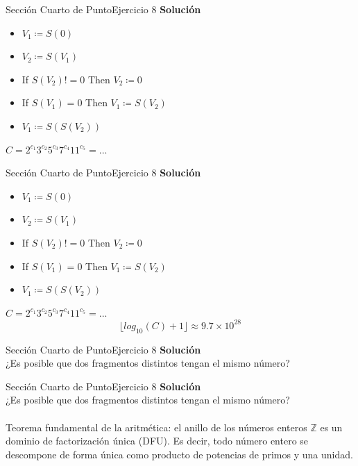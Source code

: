 \documentclass[10pt, envcountsect, presentation, aspectratio=169]{beamer}
\begin{document}

\begin{frame}{Sección Cuarto de Punto}{Ejercicio 8}
    \textbf{Solución}\\
    \begin{itemize}
        \item[] $V_1 \coloneqq S(0)$
        \item[] $V_2 \coloneqq S(V_1)$
        \item[] If $S(V_2)!=0$ Then $V_2 \coloneqq0$
        \item[] If $S(V_1)=0$ Then $V_1 \coloneqq S(V_2)$
        \item[] $V_1 \coloneqq S(S(V_2))$
    \end{itemize}
    $C = 2^{c_1} 3^{c_2} 5^{c_3} 7^{c_4} 11^{c_5} = ...$
\end{frame}


\begin{frame}{Sección Cuarto de Punto}{Ejercicio 8}
    \textbf{Solución}\\
    \begin{itemize}
        \item[] $V_1 \coloneqq S(0)$
        \item[] $V_2 \coloneqq S(V_1)$
        \item[] If $S(V_2)!=0$ Then $V_2 \coloneqq0$
        \item[] If $S(V_1)=0$ Then $V_1 \coloneqq S(V_2)$
        \item[] $V_1 \coloneqq S(S(V_2))$
    \end{itemize}
    $C = 2^{c_1} 3^{c_2} 5^{c_3} 7^{c_4} 11^{c_5} = ...$
    $$
        \lfloor log_{10}(C) + 1 \rfloor \approx 9.7 \times 10^{28}
    $$
\end{frame}


\begin{frame}{Sección Cuarto de Punto}{Ejercicio 8}
    \textbf{Solución}\\
    ¿Es posible que dos fragmentos distintos tengan el mismo número?
\end{frame}


\begin{frame}{Sección Cuarto de Punto}{Ejercicio 8}
    \textbf{Solución}\\
    ¿Es posible que dos fragmentos distintos tengan el mismo número?\\~\\
    Teorema fundamental de la aritmética: el anillo de los números enteros $\mathbb{Z}$ es un dominio de factorización única (DFU).
    Es decir, todo número entero se descompone de forma única como producto de potencias de primos y una unidad. 
\end{frame}
\end{document}
